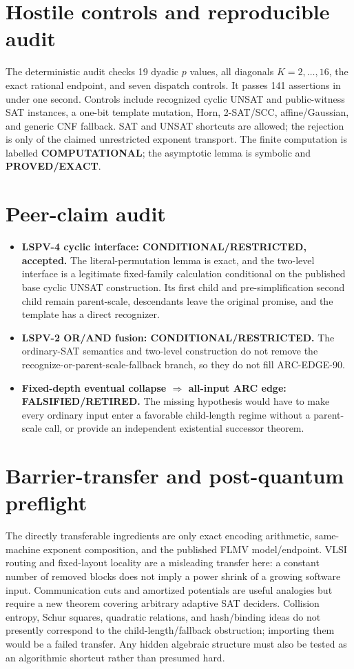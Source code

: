 \documentclass[11pt]{article}
\newcommand{\EXACT}{\textbf{PROVED/EXACT}}
\newcommand{\RET}{\textbf{FALSIFIED/RETIRED}}
\begin{document}
\section*{Hostile controls and reproducible audit}
The deterministic audit checks 19 dyadic $p$ values, all diagonals
$K=2,\ldots,16$, the exact rational endpoint, and seven dispatch controls.  It
passes 141 assertions in under one second.  Controls include recognized cyclic
UNSAT and public-witness SAT instances, a one-bit template mutation, Horn,
2-SAT/SCC, affine/Gaussian, and generic CNF fallback.  SAT and UNSAT shortcuts
are allowed; the rejection is only of the claimed unrestricted exponent
transport.  The finite computation is labelled \textbf{COMPUTATIONAL}; the
asymptotic lemma is symbolic and \EXACT.

\section*{Peer-claim audit}
\begin{itemize}
\item \textbf{LSPV-4 cyclic interface: CONDITIONAL/RESTRICTED, accepted.}
  The literal-permutation lemma is exact, and the two-level interface is a
  legitimate fixed-family calculation conditional on the published base
  cyclic UNSAT construction.  Its first child and pre-simplification second
  child remain parent-scale, descendants leave the original promise, and the
  template has a direct recognizer.
\item \textbf{LSPV-2 OR/AND fusion: CONDITIONAL/RESTRICTED.}
  The ordinary-SAT semantics and two-level construction do not remove the
  recognize-or-parent-scale-fallback branch, so they do not fill ARC-EDGE-90.
\item \textbf{Fixed-depth eventual collapse $\Rightarrow$ all-input ARC edge:
  \RET.}  The missing hypothesis would have to make every ordinary input enter
  a favorable child-length regime without a parent-scale call, or provide an
  independent existential successor theorem.
\end{itemize}

\section*{Barrier-transfer and post-quantum preflight}
The directly transferable ingredients are only exact encoding arithmetic,
same-machine exponent composition, and the published FLMV model/endpoint.
VLSI routing and fixed-layout locality are a misleading transfer here: a
constant number of removed blocks does not imply a power shrink of a growing
software input.  Communication cuts and amortized potentials are useful
analogies but require a new theorem covering arbitrary adaptive SAT deciders.
Collision entropy, Schur squares, quadratic relations, and hash/binding ideas
do not presently correspond to the child-length/fallback obstruction; importing
them would be a failed transfer.  Any hidden algebraic structure must also be
tested as an algorithmic shortcut rather than presumed hard.
\end{document}

